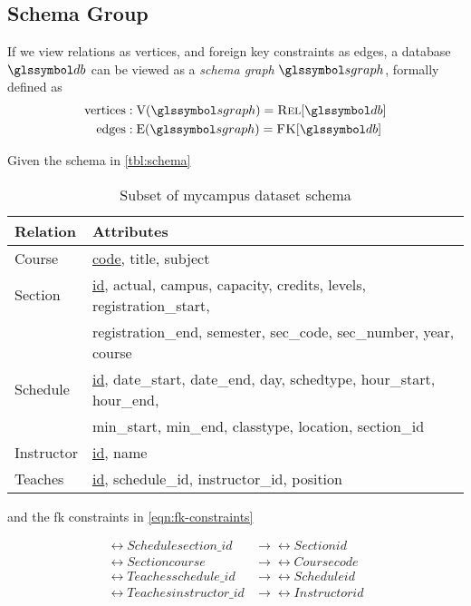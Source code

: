 	\subsection{Schema Group}
		\begin{defn}
		\label{def:schema-graph}
			If we view relations as vertices, and foreign key constraints as edges, a database \(\db\) can be viewed as a \emph{schema graph} \(\sgraph{}\), formally defined as
			\begin{align}
				\text{vertices} &: \text{V}(\sgraph) = \relations{\db} \\
				\text{edges} &: \text{E}(\sgraph) = \fks{\db}
			\end{align}
		\end{defn}
		
		\begin{ex}
			Given the schema in \vref{tbl:schema}
			
			\begin{table}[H]
				\centering
				
				\begin{tabular}{ll}
					\toprule
					Relation & Attributes \\
					\midrule
					Course & \underline{code}, title, subject \\
					Section & \underline{id}, actual, campus, capacity, credits, levels, registration\_start, \\
					 & registration\_end, semester, sec\_code, sec\_number, year, course \\
					Schedule & \underline{id}, date\_start, date\_end, day, schedtype, hour\_start, hour\_end, \\
					 & min\_start, min\_end, classtype, location, section\_id \\
					Instructor & \underline{id}, name \\
					Teaches & \underline{id}, schedule\_id, instructor\_id, position \\
					\bottomrule
				\end{tabular}
				
				\caption{Subset of mycampus dataset schema}
				\label{tbl:schema}
			\end{table}
			
			and the \gls{fk} constraints in \vref{eqn:fk-constraints}
			
			\begin{figure}[H]
				\begin{align*}
					\rel{Schedule}{section\_id} &\rightarrow \rel{Section}{id} \\
					\rel{Section}{course} &\rightarrow \rel{Course}{code} \\
					\rel{Teaches}{schedule\_id} &\rightarrow \rel{Schedule}{id} \\
					\rel{Teaches}{instructor\_id} &\rightarrow \rel{Instructor}{id} \\
				\end{align*}
				

\end{figure}
\end{ex}
